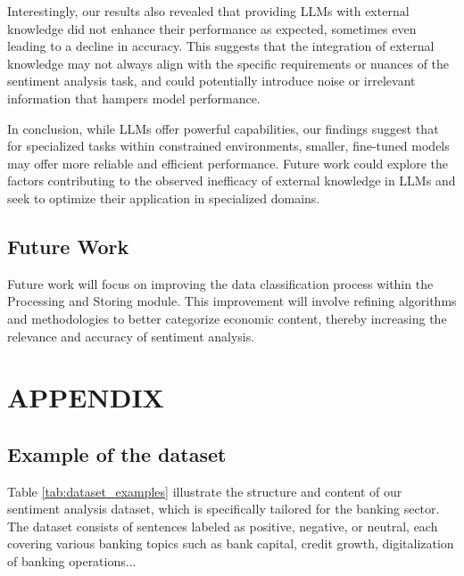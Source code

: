 {Interestingly, our results also revealed that providing LLMs with external knowledge did not enhance their performance as expected, sometimes even leading to a decline in accuracy. This suggests that the integration of external knowledge may not always align with the specific requirements or nuances of the sentiment analysis task, and could potentially introduce noise or irrelevant information that hampers model performance.

In conclusion, while LLMs offer powerful capabilities, our findings suggest that for specialized tasks within constrained environments, smaller, fine-tuned models may offer more reliable and efficient performance. Future work could explore the factors contributing to the observed inefficacy of external knowledge in LLMs and seek to optimize their application in specialized domains.

\subsection{Future Work}
Future work will focus on improving the data classification process within the Processing and Storing module. This improvement will involve refining algorithms and methodologies to better categorize economic content, thereby increasing the relevance and accuracy of sentiment analysis.

\section*{APPENDIX}

\appendix
\subsection{Example of the dataset}\label{app:dataset}
Table \ref{tab:dataset_examples} illustrate the structure and content of our sentiment analysis dataset, which is specifically tailored for the banking sector. The dataset consists of sentences labeled as positive, negative, or neutral, each covering various banking topics such as bank capital, credit growth, digitalization of banking operations...

}
